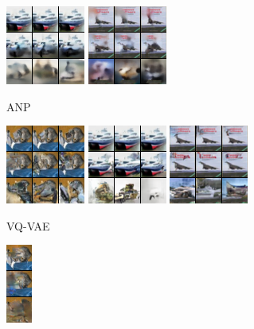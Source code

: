 \begin{figure}[t]
\begin{subfigure}[t]{0.17\textwidth}
      \includegraphics[height=\cifarimgheight]{figs/cigcvae/image-samples/cifar10/freeform_anp_1_samples}
      \includegraphics[height=\cifarimgheight]{figs/cigcvae/image-samples/cifar10/freeform_anp_3_samples}
      \caption{ANP}
    \end{subfigure}
    \begin{subfigure}[t]{0.17\textwidth}
      \centering
      \includegraphics[height=\cifarimgheight]{figs/cigcvae/image-samples/cifar10/freeform_vq_vae_0_samples}
      \includegraphics[height=\cifarimgheight]{figs/cigcvae/image-samples/cifar10/freeform_vq_vae_1_samples}
      \includegraphics[height=\cifarimgheight]{figs/cigcvae/image-samples/cifar10/freeform_vq_vae_3_samples}
      \caption{VQ-VAE}
    \end{subfigure}
    \begin{subfigure}[t]{0.08\textwidth}
      \centering
      \includegraphics[height=\cifarimgheight]{figs/cigcvae/image-samples/cifar10/freeform_ce_0_samples}

\end{subfigure}
\end{figure}
